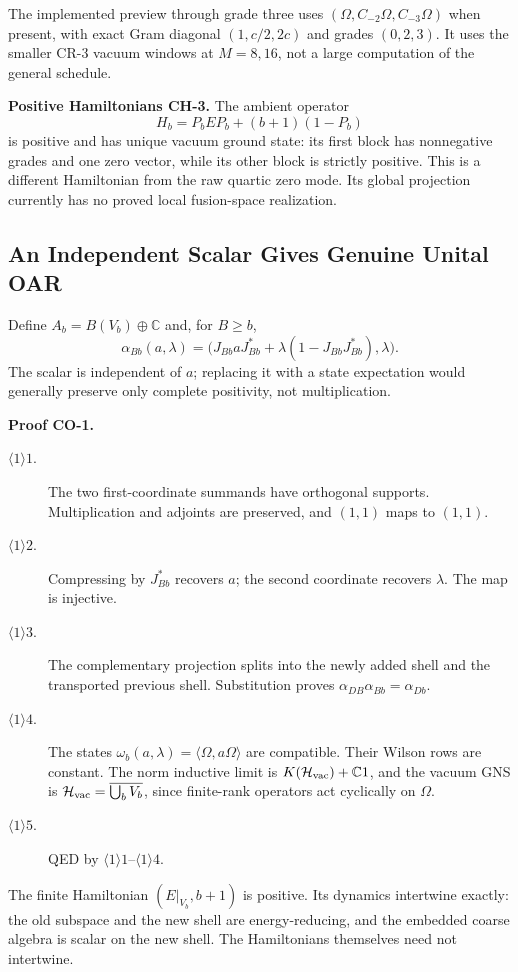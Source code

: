 The implemented preview through grade three uses
$(\Omega,C_{-2}\Omega,C_{-3}\Omega)$ when present, with exact Gram diagonal
$(1,c/2,2c)$ and grades $(0,2,3)$. It uses the smaller CR-3 vacuum windows
at $M=8,16$, not a large computation of the general schedule.

\textbf{Positive Hamiltonians CH-3.} The ambient operator
\[
 H_b=P_bEP_b+(b+1)(1-P_b)
\]
is positive and has unique vacuum ground state: its first block has
nonnegative grades and one zero vector, while its other block is strictly
positive. This is a different Hamiltonian from the raw quartic zero mode.
Its global projection currently has no proved local fusion-space realization.

\subsection{An Independent Scalar Gives Genuine Unital OAR}

Define $A_b=B(V_b)\oplus\mathbb C$ and, for $B\ge b$,
\[
 \alpha_{Bb}(a,\lambda)=
 \bigl(J_{Bb}aJ_{Bb}^*+\lambda(1-J_{Bb}J_{Bb}^*),\lambda\bigr).
\]
The scalar is independent of $a$; replacing it with a state expectation
would generally preserve only complete positivity, not multiplication.

\textbf{Proof CO-1.}
\begin{description}
\item[$\langle1\rangle1$.] The two first-coordinate summands have
orthogonal supports. Multiplication and adjoints are preserved, and
$(1,1)$ maps to $(1,1)$.
\item[$\langle1\rangle2$.] Compressing by $J_{Bb}^*$ recovers $a$;
the second coordinate recovers $\lambda$. The map is injective.
\item[$\langle1\rangle3$.] The complementary projection splits into
the newly added shell and the transported previous shell. Substitution
proves $\alpha_{DB}\alpha_{Bb}=\alpha_{Db}$.
\item[$\langle1\rangle4$.] The states
$\omega_b(a,\lambda)=\langle\Omega,a\Omega\rangle$ are compatible.
Their Wilson rows are constant. The norm inductive limit is
$K(\mathcal H_{\rm vac})+\mathbb C1$, and the vacuum GNS is
$\mathcal H_{\rm vac}=\overline{\bigcup_bV_b}$, since finite-rank operators
act cyclically on $\Omega$.
\item[$\langle1\rangle5$.] QED by $\langle1\rangle1$--$\langle1\rangle4$.
\end{description}
The finite Hamiltonian $(E|_{V_b},b+1)$ is positive. Its dynamics intertwine
exactly: the old subspace and the new shell are energy-reducing, and the
embedded coarse algebra is scalar on the new shell. The Hamiltonians
themselves need not intertwine.

